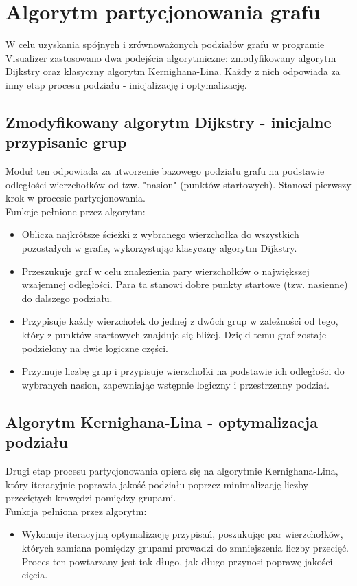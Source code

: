 \documentclass[a4paper,12pt]{article}
\begin{document}
\section{Algorytm partycjonowania grafu}
W celu uzyskania spójnych i zrównoważonych podziałów grafu w programie Visualizer zastosowano dwa podejścia algorytmiczne: zmodyfikowany algorytm Dijkstry oraz klasyczny algorytm Kernighana-Lina. Każdy z nich odpowiada za inny etap procesu podziału - inicjalizację i optymalizację.

\subsection{Zmodyfikowany algorytm Dijkstry - inicjalne przypisanie grup}
Moduł ten odpowiada za utworzenie bazowego podziału grafu na podstawie odległości wierzchołków od tzw. "nasion" (punktów startowych). Stanowi pierwszy krok w procesie partycjonowania. \\
Funkcje pełnione przez algorytm:
\begin{itemize}
  \item Oblicza najkrótsze ścieżki z wybranego wierzchołka do wszystkich pozostałych w grafie, wykorzystując klasyczny algorytm Dijkstry.
  \item Przeszukuje graf w celu znalezienia pary wierzchołków o największej wzajemnej odległości. Para ta stanowi dobre punkty startowe (tzw. nasienne) do dalszego podziału.
  \item Przypisuje każdy wierzchołek do jednej z dwóch grup w zależności od tego, który z punktów startowych znajduje się bliżej. Dzięki temu graf zostaje podzielony na dwie logiczne części.
  \item Przymuje liczbę grup i przypisuje wierzchołki na podstawie ich odległości do wybranych nasion, zapewniając wstępnie logiczny i przestrzenny podział.
\end{itemize}

\subsection{Algorytm Kernighana-Lina - optymalizacja podziału}
Drugi etap procesu partycjonowania opiera się na algorytmie Kernighana-Lina, który iteracyjnie poprawia jakość podziału poprzez minimalizację liczby przeciętych krawędzi pomiędzy grupami. \\
Funkcja pełniona przez algorytm:
\begin{itemize}
  \item Wykonuje iteracyjną optymalizację przypisań, poszukując par wierzchołków, których zamiana pomiędzy grupami prowadzi do zmniejszenia liczby przecięć. Proces ten powtarzany jest tak długo, jak długo przynosi poprawę jakości cięcia.
\end{itemize}
\end{document}
